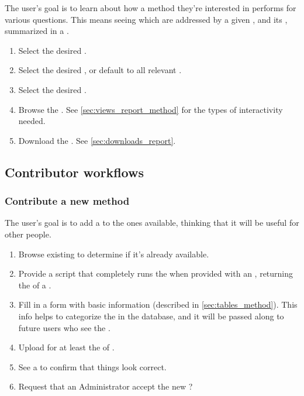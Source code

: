 The user's goal is to learn about how a method they're interested in performs for various questions.
This means seeing which \Tasks are addressed by a given \Method, and its \Performance, summarized in a \Report.

\begin{enumerate}
    \item Select the desired \Method.
    \item Select the desired \Task, or default to all relevant \Tasks.
    \item Select the desired \Elements.
    \item Browse the \Report.
          See \cref{sec:views_report_method} for the types of interactivity needed.
    \item Download the \Report.
          See \cref{sec:downloads_report}.
\end{enumerate}

\subsection{Contributor workflows}
\label{sec:workflows_contrib}


\subsubsection{Contribute a new method}

The user's goal is to add a \Method to the ones available, thinking that it will be useful for other people.

\begin{enumerate}
    \item Browse existing \Methods to determine if it's already available.
    \item Provide a script that completely runs the \Method when provided with an \Element, returning the \Result of a \Task.
    \item Fill in a form with basic information (described in \cref{sec:tables_method}).
          This info helps to categorize the \Method in the database, and it will be passed along to future users who see the \Method.
    \item Upload \Results for at least the \Benchmark of \Elements.
    \item See a \Report to confirm that things look correct.
    \item Request that an Administrator accept the new \Method?
\end{enumerate}

